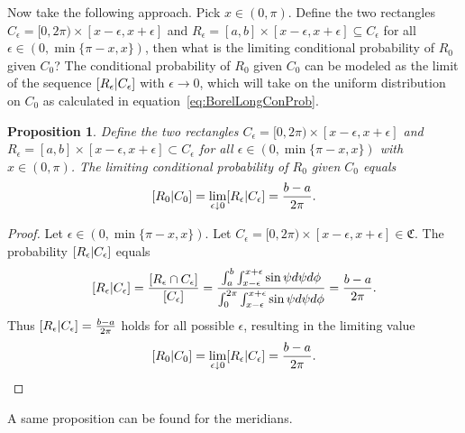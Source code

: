 \documentclass[twoside,a4paper]{report}
\theoremstyle{plain}
\newtheorem{proposition}[theorem]{Proposition}
\theoremstyle{definition}
\theoremstyle{remark}
\numberwithin{equation}{chapter}
\let\P\relax
\DeclareMathOperator{\P}{\mathbb{P}}
\DeclareMathOperator{\1}{\mathbbm{1}}
\begin{document}
Now take the following approach. Pick $x\in(0,\pi)$. Define the two rectangles $C_\epsilon=[0,2\pi)\times[x-\epsilon,x+\epsilon]$ and $R_\epsilon=[a,b]\times[x-\epsilon,x+\epsilon]\subseteq C_\epsilon$ for all ${\epsilon\in(0,\min\{\pi-x,x\})}$, then what is the limiting conditional probability of $R_0$ given $C_0$? The conditional probability of $R_0$ given $C_0$ can be modeled as the limit of the sequence $\P[R_\epsilon|C_\epsilon]$ with $\epsilon\to0$, which will take on the uniform distribution on $C_0$ as calculated in equation~\ref{eq:BorelLongConProb}.
\begin{proposition}\label{prop:BorelLongBayes}
Define the two rectangles $C_\epsilon=[0,2\pi)\times[x-\epsilon,x+\epsilon]$ and $R_\epsilon=[a,b]\times[x-\epsilon,x+\epsilon]\subset C_\epsilon$ for all $\epsilon\in(0,\min\{\pi-x,x\})$ with $x\in(0,\pi)$. The limiting conditional probability of $R_0$ given $C_0$ equals
\begin{equation}
\P[R_0|C_0]=\lim_{\epsilon\downarrow0}\P[R_\epsilon|C_\epsilon]=\frac{b-a}{2\pi}.
\end{equation}
\end{proposition}
\begin{proof}
Let $\epsilon\in(0,\min\{\pi-x,x\})$. Let $C_\epsilon=[0,2\pi)\times[x-\epsilon,x+\epsilon]\in\mathfrak{C}$. The probability $\P[R_\epsilon|C_\epsilon]$ equals
\begin{equation}
\P[R_\epsilon|C_\epsilon]=\frac{\P[R_\epsilon\cap C_\epsilon]}{\P[C_\epsilon]}=\frac{\int_{a}^{b}\int_{x-\epsilon}^{x+\epsilon}\sin\psi d\psi d\phi}{\int_{0}^{2\pi}\int_{x-\epsilon}^{x+\epsilon}\sin\psi d\psi d\phi}=\frac{b-a}{2\pi}.
\end{equation}
Thus $\P[R_\epsilon|C_\epsilon]=\frac{b-a}{2\pi}$ holds for all possible $\epsilon$, resulting in the limiting value
\begin{equation}
\P[R_0|C_0]=\lim_{\epsilon\downarrow0}\P[R_\epsilon|C_\epsilon]=\frac{b-a}{2\pi}.
\end{equation}
\end{proof}

A same proposition can be found for the meridians.
\end{document}
